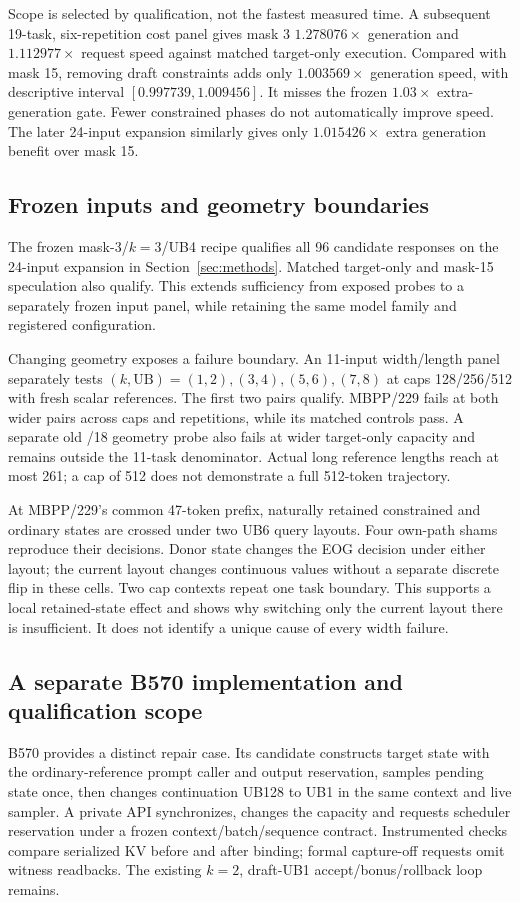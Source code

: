 Scope is selected by qualification, not the fastest measured time. A subsequent 19-task, six-repetition cost panel gives mask 3 $1.278076\times$ generation and $1.112977\times$ request speed against matched target-only execution. Compared with mask 15, removing draft constraints adds only $1.003569\times$ generation speed, with descriptive interval $[0.997739,1.009456]$. It misses the frozen $1.03\times$ extra-generation gate. Fewer constrained phases do not automatically improve speed. The later 24-input expansion similarly gives only $1.015426\times$ extra generation benefit over mask 15.

\subsection{Frozen inputs and geometry boundaries}
The frozen mask-3/$k=3$/UB4 recipe qualifies all 96 candidate responses on the 24-input expansion in Section~\ref{sec:methods}. Matched target-only and mask-15 speculation also qualify. This extends sufficiency from exposed probes to a separately frozen input panel, while retaining the same model family and registered configuration.

Changing geometry exposes a failure boundary. An 11-input width/length panel separately tests $(k,\mathrm{UB})=(1,2),(3,4),(5,6),(7,8)$ at caps 128/256/512 with fresh scalar references. The first two pairs qualify. MBPP/229 fails at both wider pairs across caps and repetitions, while its matched controls pass. A separate old /18 geometry probe also fails at wider target-only capacity and remains outside the 11-task denominator. Actual long reference lengths reach at most 261; a cap of 512 does not demonstrate a full 512-token trajectory.

At MBPP/229's common 47-token prefix, naturally retained constrained and ordinary states are crossed under two UB6 query layouts. Four own-path shams reproduce their decisions. Donor state changes the EOG decision under either layout; the current layout changes continuous values without a separate discrete flip in these cells. Two cap contexts repeat one task boundary. This supports a local retained-state effect and shows why switching only the current layout there is insufficient. It does not identify a unique cause of every width failure.

\subsection{A separate B570 implementation and qualification scope}
B570 provides a distinct repair case. Its candidate constructs target state with the ordinary-reference prompt caller and output reservation, samples pending state once, then changes continuation UB128 to UB1 in the same context and live sampler. A private API synchronizes, changes the capacity and requests scheduler reservation under a frozen context/batch/sequence contract. Instrumented checks compare serialized KV before and after binding; formal capture-off requests omit witness readbacks. The existing $k=2$, draft-UB1 accept/bonus/rollback loop remains.

